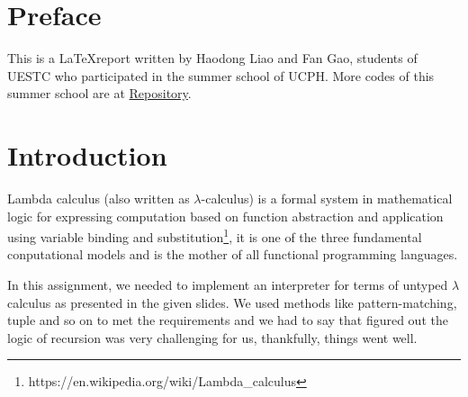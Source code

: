 \documentclass{article}
\begin{document}





\section{Preface}

This is a \LaTeX report written by Haodong Liao and Fan Gao, students of UESTC who participated in the summer school of UCPH. More codes of this summer school are at \href{https://github.com/Medill-East/ComputerScience/tree/master/Professional%20Core%20Courses/Functional%20Programming/SummerSchool/Advanced%20Functional%20Programming/AdvancedFunctionalProgramming/AdvancedFunctionalProgramming}{Repository}.

\section{Introduction}

Lambda calculus (also written as $\lambda$-calculus) is a formal system in mathematical logic for expressing computation based on function abstraction and application using variable binding and substitution\footnote[1]{https://en.wikipedia.org/wiki/Lambda\_calculus}, it is one of the three fundamental conputational models and is the mother of all functional programming languages.

In this assignment, we needed to implement an interpreter for terms of untyped $\lambda$ calculus as presented in the given slides. We used methods like pattern-matching, tuple and so on to met the requirements and we had to say that figured out the logic of recursion was very challenging for us, thankfully, things went well.


\end{document}
